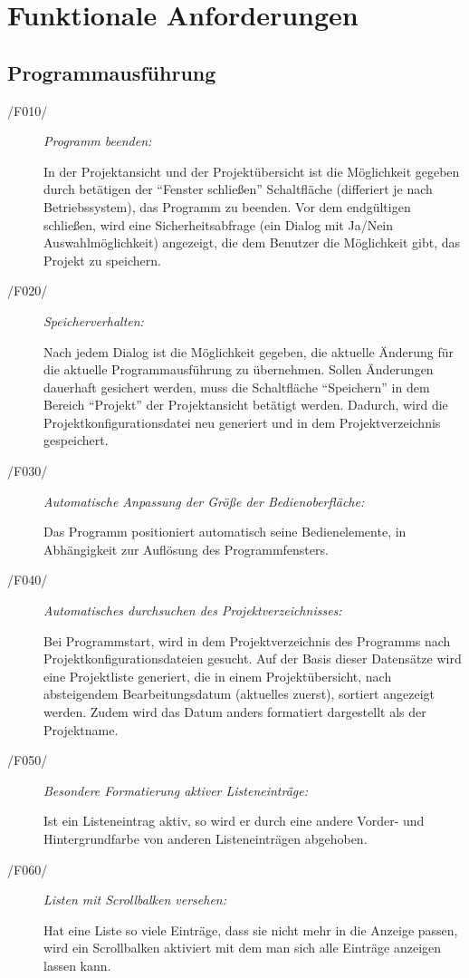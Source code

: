 \section{Funktionale Anforderungen}

\subsection{Programmausführung}

\label{subsec:programmausfuehrung}

	\begin{description}
		
		\item[/F010/] \textit{Programm beenden:}\par In der Projektansicht und der Projektübersicht ist die Möglichkeit gegeben durch betätigen der "`Fenster schließen"' Schaltfläche (differiert je nach Betriebssystem), das Programm zu beenden. Vor dem endgültigen schließen, wird eine Sicherheitsabfrage (ein Dialog mit Ja/Nein Auswahlmöglichkeit) angezeigt, die dem Benutzer die Möglichkeit gibt, das Projekt zu speichern.
		
		\item[/F020/] \textit{Speicherverhalten:}\par Nach jedem Dialog ist die Möglichkeit gegeben, die aktuelle Änderung für die aktuelle Programmausführung zu übernehmen. Sollen Änderungen dauerhaft gesichert werden, muss die Schaltfläche "`Speichern"' in dem Bereich "`Projekt"' der Projektansicht betätigt werden. Dadurch, wird die Projektkonfigurationsdatei neu generiert und in dem Projektverzeichnis gespeichert.
		
		\item[/F030/] \textit{Automatische Anpassung der Größe der Bedienoberfläche:}\par Das Programm positioniert automatisch seine Bedienelemente, in Abhängigkeit zur Auflösung des Programmfensters.
		
		\item[/F040/] \textit{Automatisches durchsuchen des Projektverzeichnisses:}\par Bei Programmstart, wird in dem Projektverzeichnis des Programms nach Projektkonfigurationsdateien gesucht. Auf der Basis dieser Datensätze wird eine Projektliste generiert, die in einem Projektübersicht, nach absteigendem Bearbeitungsdatum (aktuelles zuerst), sortiert angezeigt werden. Zudem wird das Datum anders formatiert dargestellt als der Projektname.
		
		\item[/F050/] \textit{Besondere Formatierung aktiver Listeneinträge:}\par Ist ein Listeneintrag aktiv, so wird er durch eine andere Vorder- und Hintergrundfarbe von anderen Listeneinträgen abgehoben.

		\item[/F060/] \textit{Listen mit Scrollbalken versehen:}\par Hat eine Liste so viele Einträge, dass sie nicht mehr in die Anzeige passen, wird ein Scrollbalken aktiviert mit dem man sich alle Einträge anzeigen lassen kann.
		
	\end{description}

